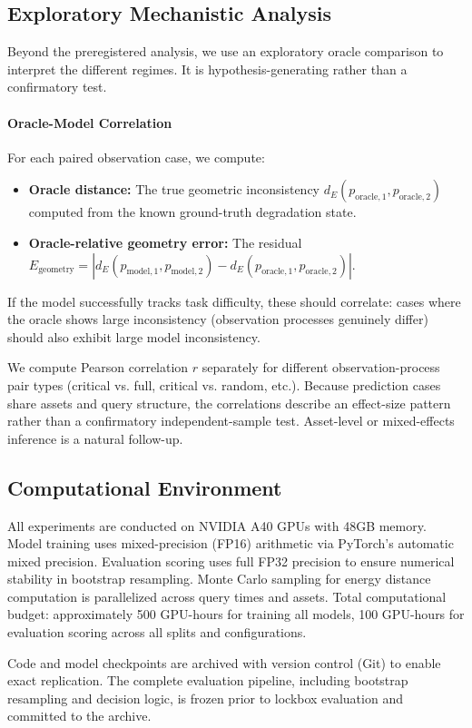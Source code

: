 \subsection{Exploratory Mechanistic Analysis}
\label{sec:methods:exploratory}

Beyond the preregistered analysis, we use an exploratory oracle comparison to interpret the different regimes. It is hypothesis-generating rather than a confirmatory test.

\paragraph{Oracle-Model Correlation}
For each paired observation case, we compute:
\begin{itemize}
    \item \textbf{Oracle distance:} The true geometric inconsistency $d_E(p_{\text{oracle},1}, p_{\text{oracle},2})$ computed from the known ground-truth degradation state.
    \item \textbf{Oracle-relative geometry error:} The residual
    $E_{\mathrm{geometry}}=|d_E(p_{\text{model},1},p_{\text{model},2})-d_E(p_{\text{oracle},1},p_{\text{oracle},2})|$.
\end{itemize}

If the model successfully tracks task difficulty, these should correlate: cases where the oracle shows large inconsistency (observation processes genuinely differ) should also exhibit large model inconsistency.

We compute Pearson correlation $r$ separately for different observation-process pair types (critical vs. full, critical vs. random, etc.). Because prediction cases share assets and query structure, the correlations describe an effect-size pattern rather than a confirmatory independent-sample test. Asset-level or mixed-effects inference is a natural follow-up.

\subsection{Computational Environment}

All experiments are conducted on NVIDIA A40 GPUs with 48GB memory. Model training uses mixed-precision (FP16) arithmetic via PyTorch's automatic mixed precision. Evaluation scoring uses full FP32 precision to ensure numerical stability in bootstrap resampling. Monte Carlo sampling for energy distance computation is parallelized across query times and assets. Total computational budget: approximately 500 GPU-hours for training all models, 100 GPU-hours for evaluation scoring across all splits and configurations.

Code and model checkpoints are archived with version control (Git) to enable
exact replication. The complete evaluation pipeline, including bootstrap
resampling and decision logic, is frozen prior to lockbox evaluation and
committed to the archive.
